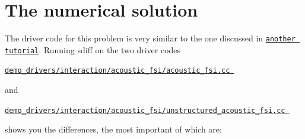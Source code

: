 \hypertarget{index_num}{}\section{The numerical solution}\label{index_num}
The driver code for this problem is very similar to the one discussed in \href{../../acoustic_fsi_annulus/html/index.html}{\tt another tutorial}. Running {\ttfamily sdiff} on the two driver codes \begin{center} \href{../../../../demo_drivers/interaction/acoustic_fsi/acoustic_fsi.cc}{\tt demo\+\_\+drivers/interaction/acoustic\+\_\+fsi/acoustic\+\_\+fsi.\+cc } \end{center}  and \begin{center} \href{../../../../demo_drivers/interaction/acoustic_fsi/unstructured_acoustic_fsi.cc}{\tt demo\+\_\+drivers/interaction/acoustic\+\_\+fsi/unstructured\+\_\+acoustic\+\_\+fsi.\+cc } \end{center}  shows you the differences, the most important of which are\+:
